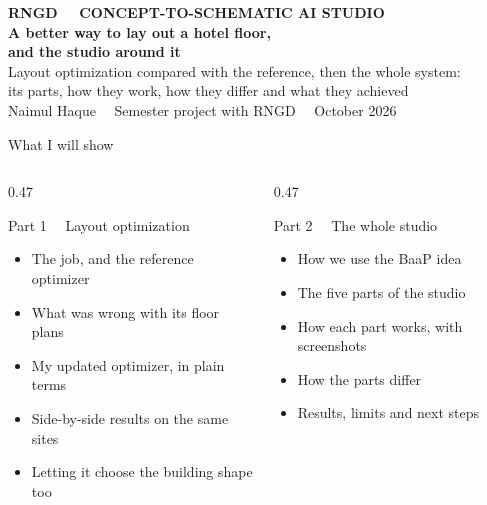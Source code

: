 \documentclass[9pt,aspectratio=169]{beamer}
\begin{document}
{
\begin{frame}[plain]
\vspace*{0.9cm}
{\color{amber}\small\bfseries RNGD \ \textbullet\ CONCEPT-TO-SCHEMATIC AI STUDIO}\\[0.7cm]
{\color{paper}\fontsize{22}{27}\selectfont\bfseries A better way to lay out a hotel floor,\\[0.15cm] and the studio around it}\\[0.7cm]
{\color{paper!80}\large Layout optimization compared with the reference, then the whole system:\\ its parts, how they work, how they differ and what they achieved}\\[1.1cm]
{\color{paper!65}Naimul Haque \ \textbullet\ Semester project with RNGD \ \textbullet\ October 2026}
\end{frame}}

\begin{frame}{What I will show}
\begin{columns}[T]
\begin{column}{0.47\textwidth}
\begin{block}{Part 1 \ \textbullet\ Layout optimization}
\begin{itemize}
\item The job, and the reference optimizer
\item What was wrong with its floor plans
\item My updated optimizer, in plain terms
\item Side-by-side results on the same sites
\item Letting it choose the building shape too
\end{itemize}
\end{block}
\end{column}
\begin{column}{0.47\textwidth}
\begin{block}{Part 2 \ \textbullet\ The whole studio}
\begin{itemize}
\item How we use the BaaP idea
\item The five parts of the studio
\item How each part works, with screenshots
\item How the parts differ
\item Results, limits and next steps
\end{itemize}
\end{block}
\end{column}
\end{columns}
\end{frame}
\end{document}
